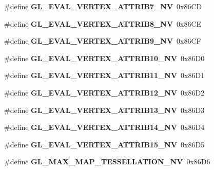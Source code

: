 \begin{DoxyCompactItemize}
\item 
\#define {\bfseries G\+L\+\_\+\+E\+V\+A\+L\+\_\+\+V\+E\+R\+T\+E\+X\+\_\+\+A\+T\+T\+R\+I\+B7\+\_\+\+N\+V}~0x86\+C\+D\label{_s_d_l__opengl_8h_a14b691e0ae2cbc749066953836cb978a}

\item 
\#define {\bfseries G\+L\+\_\+\+E\+V\+A\+L\+\_\+\+V\+E\+R\+T\+E\+X\+\_\+\+A\+T\+T\+R\+I\+B8\+\_\+\+N\+V}~0x86\+C\+E\label{_s_d_l__opengl_8h_ae77da54964c2a043f5cb07012262dd4c}

\item 
\#define {\bfseries G\+L\+\_\+\+E\+V\+A\+L\+\_\+\+V\+E\+R\+T\+E\+X\+\_\+\+A\+T\+T\+R\+I\+B9\+\_\+\+N\+V}~0x86\+C\+F\label{_s_d_l__opengl_8h_acb3cf8de72e70bd779113b4b4d96239f}

\item 
\#define {\bfseries G\+L\+\_\+\+E\+V\+A\+L\+\_\+\+V\+E\+R\+T\+E\+X\+\_\+\+A\+T\+T\+R\+I\+B10\+\_\+\+N\+V}~0x86\+D0\label{_s_d_l__opengl_8h_a32e8c2e8b02bc8fdd6ce9c550baf8a9b}

\item 
\#define {\bfseries G\+L\+\_\+\+E\+V\+A\+L\+\_\+\+V\+E\+R\+T\+E\+X\+\_\+\+A\+T\+T\+R\+I\+B11\+\_\+\+N\+V}~0x86\+D1\label{_s_d_l__opengl_8h_aae88b48e60fffd44eceb95b8fec64456}

\item 
\#define {\bfseries G\+L\+\_\+\+E\+V\+A\+L\+\_\+\+V\+E\+R\+T\+E\+X\+\_\+\+A\+T\+T\+R\+I\+B12\+\_\+\+N\+V}~0x86\+D2\label{_s_d_l__opengl_8h_aafdd41661a0e66603bb9b5187fb22d39}

\item 
\#define {\bfseries G\+L\+\_\+\+E\+V\+A\+L\+\_\+\+V\+E\+R\+T\+E\+X\+\_\+\+A\+T\+T\+R\+I\+B13\+\_\+\+N\+V}~0x86\+D3\label{_s_d_l__opengl_8h_ab626658e0524d4cb1fc21b2ef75eb077}

\item 
\#define {\bfseries G\+L\+\_\+\+E\+V\+A\+L\+\_\+\+V\+E\+R\+T\+E\+X\+\_\+\+A\+T\+T\+R\+I\+B14\+\_\+\+N\+V}~0x86\+D4\label{_s_d_l__opengl_8h_a096a4856e83659669617d2ff50a86481}

\item 
\#define {\bfseries G\+L\+\_\+\+E\+V\+A\+L\+\_\+\+V\+E\+R\+T\+E\+X\+\_\+\+A\+T\+T\+R\+I\+B15\+\_\+\+N\+V}~0x86\+D5\label{_s_d_l__opengl_8h_ac2d950abf392e84ab43057381b285e79}

\item 
\#define {\bfseries G\+L\+\_\+\+M\+A\+X\+\_\+\+M\+A\+P\+\_\+\+T\+E\+S\+S\+E\+L\+L\+A\+T\+I\+O\+N\+\_\+\+N\+V}~0x86\+D6\label{_s_d_l__opengl_8h_aa7e75cddcd1f8297784205c568570210}


\end{DoxyCompactItemize}

